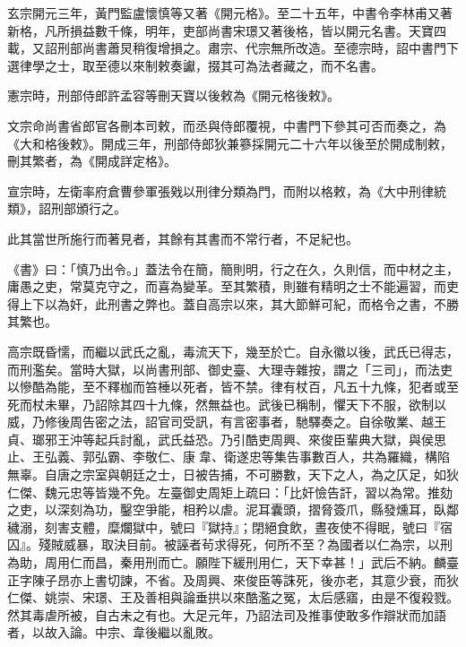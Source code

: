 \begin{pinyinscope}
 玄宗開元三年，黃門監盧懷慎等又著《開元格》。至二十五年，中書令李林甫又著新格，凡所損益數千條，明年，吏部尚書宋璟又著後格，皆以開元名書。天寶四載，又詔刑部尚書蕭炅稍復增損之。肅宗、代宗無所改造。至德宗時，詔中書門下選律學之士，取至德以來制敕奏讞，掇其可為法者藏之，而不名書。



 憲宗時，刑部侍郎許孟容等刪天寶以後敕為《開元格後敕》。



 文宗命尚書省郎官各刪本司敕，而丞與侍郎覆視，中書門下參其可否而奏之，為《大和格後敕》。開成三年，刑部侍郎狄兼篸採開元二十六年以後至於開成制敕，刪其繁者，為《開成詳定格》。



 宣宗時，左衛率府倉曹參軍張戣以刑律分類為門，而附以格敕，為《大中刑律統類》，詔刑部頒行之。



 此其當世所施行而著見者，其餘有其書而不常行者，不足紀也。



 《書》曰：「慎乃出令。」蓋法令在簡，簡則明，行之在久，久則信，而中材之主，庸愚之吏，常莫克守之，而喜為變革。至其繁積，則雖有精明之士不能遍習，而吏得上下以為奸，此刑書之弊也。蓋自高宗以來，其大節鮮可紀，而格令之書，不勝其繁也。



 高宗既昏懦，而繼以武氏之亂，毒流天下，幾至於亡。自永徽以後，武氏已得志，而刑濫矣。當時大獄，以尚書刑部、御史臺、大理寺雜按，謂之「三司」，而法吏以慘酷為能，至不釋枷而笞棰以死者，皆不禁。律有杖百，凡五十九條，犯者或至死而杖未畢，乃詔除其四十九條，然無益也。武後已稱制，懼天下不服，欲制以威，乃修後周告密之法，詔官司受訊，有言密事者，馳驛奏之。自徐敬業、越王貞、瑯邪王沖等起兵討亂，武氏益恐。乃引酷吏周興、來俊臣輩典大獄，與侯思止、王弘義、郭弘霸、李敬仁、康韋、衛遂忠等集告事數百人，共為羅織，構陷無辜。自唐之宗室與朝廷之士，日被告捕，不可勝數，天下之人，為之仄足，如狄仁傑、魏元忠等皆幾不免。左臺御史周矩上疏曰：「比奸憸告訐，習以為常。推劾之吏，以深刻為功，鑿空爭能，相矜以虐。泥耳囊頭，摺脅簽爪，縣發燻耳，臥鄰穢溺，刻害支體，糜爛獄中，號曰『獄持』；閉絕食飲，晝夜使不得眠，號曰『宿囚』。殘賊威暴，取決目前。被誣者茍求得死，何所不至？為國者以仁為宗，以刑為助，周用仁而昌，秦用刑而亡。願陛下緩刑用仁，天下幸甚！」武后不納。麟臺正字陳子昂亦上書切諫，不省。及周興、來俊臣等誅死，後亦老，其意少衰，而狄仁傑、姚崇、宋璟、王及善相與論垂拱以來酷濫之冤，太后感寤，由是不復殺戮。然其毒虐所被，自古未之有也。大足元年，乃詔法司及推事使敢多作辯狀而加語者，以故入論。中宗、韋後繼以亂敗。




\end{pinyinscope}
